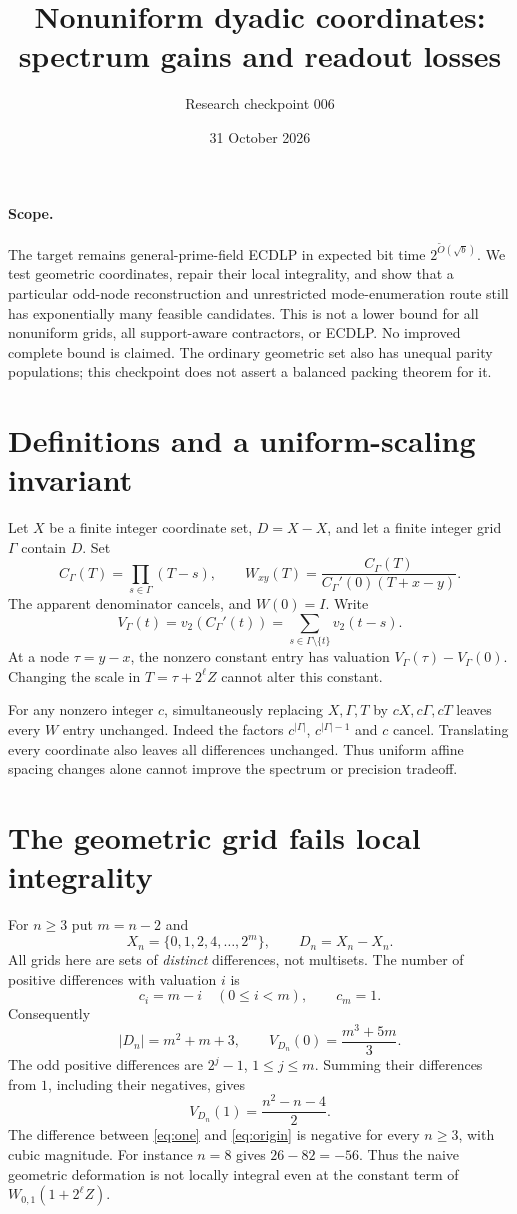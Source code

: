 \documentclass[11pt]{article}
\title{Nonuniform dyadic coordinates: spectrum gains and readout losses}
\author{Research checkpoint 006}
\date{31 October 2026}
\begin{document}
\maketitle

\paragraph{Scope.}
The target remains general-prime-field ECDLP in expected bit time
$2^{\widetilde O(\sqrt b)}$. We test geometric coordinates, repair their
local integrality, and show that a particular odd-node reconstruction
and unrestricted mode-enumeration route still has exponentially many
feasible candidates. This is not a lower bound for all nonuniform grids,
all support-aware contractors, or ECDLP. No improved complete bound is
claimed. The ordinary geometric set also has unequal parity populations;
this checkpoint does not assert a balanced packing theorem for it.

\section{Definitions and a uniform-scaling invariant}
Let $X$ be a finite integer coordinate set, $D=X-X$, and let a finite
integer grid $\Gamma$ contain $D$. Set
\[
 C_\Gamma(T)=\prod_{s\in\Gamma}(T-s),\qquad
 W_{xy}(T)=\frac{C_\Gamma(T)}{C_\Gamma'(0)(T+x-y)}.
\]
The apparent denominator cancels, and $W(0)=I$. Write
\[
 V_\Gamma(t)=v_2(C_\Gamma'(t))
 =\sum_{s\in\Gamma\setminus\{t\}}v_2(t-s).
\]
At a node $\tau=y-x$, the nonzero constant entry has valuation
$V_\Gamma(\tau)-V_\Gamma(0)$. Changing the scale in
$T=\tau+2^\ell Z$ cannot alter this constant.

For any nonzero integer $c$, simultaneously replacing $X,\Gamma,T$
by $cX,c\Gamma,cT$ leaves every $W$ entry unchanged. Indeed the factors
$c^{|\Gamma|}$, $c^{|\Gamma|-1}$ and $c$ cancel. Translating every
coordinate also leaves all differences unchanged. Thus uniform affine
spacing changes alone cannot improve the spectrum or precision tradeoff.

\section{The geometric grid fails local integrality}
For $n\ge3$ put $m=n-2$ and
\[
 X_n=\{0,1,2,4,\ldots,2^m\},\qquad D_n=X_n-X_n.
\]
All grids here are sets of \emph{distinct} differences, not multisets.
The number of positive differences with valuation $i$ is
\[
 c_i=m-i\quad(0\le i<m),\qquad c_m=1.
\]
Consequently
\begin{equation}
 |D_n|=m^2+m+3,\qquad
 V_{D_n}(0)=\frac{m^3+5m}{3}.
 \label{eq:origin}
\end{equation}
The odd positive differences are $2^j-1$, $1\le j\le m$.
Summing their differences from $1$, including their negatives, gives
\begin{equation}
 V_{D_n}(1)=\frac{n^2-n-4}{2}.
 \label{eq:one}
\end{equation}
The difference between \eqref{eq:one} and \eqref{eq:origin} is negative
for every $n\ge3$, with cubic magnitude. For instance $n=8$ gives
$26-82=-56$. Thus the naive geometric deformation is not locally
integral even at the constant term of $W_{0,1}(1+2^\ell Z)$.
\end{document}
